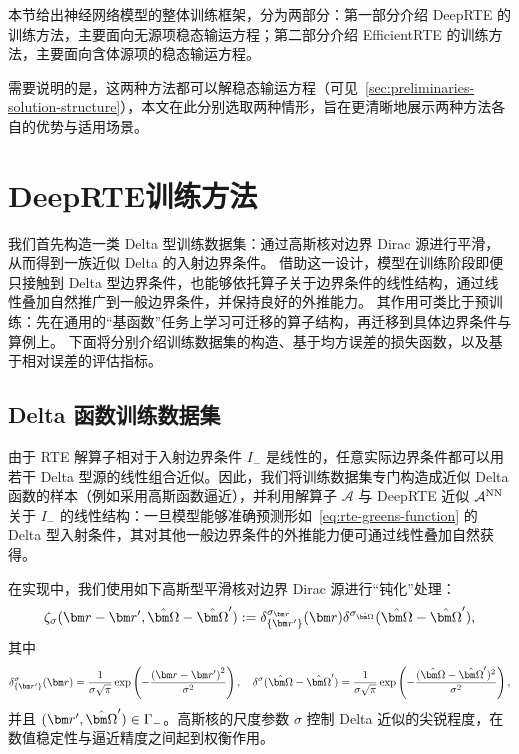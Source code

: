 
本节给出神经网络模型的整体训练框架，分为两部分：第一部分介绍 DeepRTE 的训练方法，主要面向无源项稳态输运方程；第二部分介绍 EfficientRTE 的训练方法，主要面向含体源项的稳态输运方程。

需要说明的是，这两种方法都可以解稳态输运方程（可见~\ref{sec:preliminaries-solution-structure}），本文在此分别选取两种情形，旨在更清晰地展示两种方法各自的优势与适用场景。

\section{DeepRTE训练方法}


我们首先构造一类 Delta 型训练数据集：通过高斯核对边界 Dirac 源进行平滑，从而得到一族近似 Delta 的入射边界条件。
借助这一设计，模型在训练阶段即便只接触到 Delta 型边界条件，也能够依托算子关于边界条件的线性结构，通过线性叠加自然推广到一般边界条件，并保持良好的外推能力。
其作用可类比于预训练：先在通用的“基函数”任务上学习可迁移的算子结构，再迁移到具体边界条件与算例上。
下面将分别介绍训练数据集的构造、基于均方误差的损失函数，以及基于相对误差的评估指标。

\subsection{Delta 函数训练数据集}

由于 RTE 解算子相对于入射边界条件 $I_-$ 是线性的，任意实际边界条件都可以用若干 Delta 型源的线性组合近似。因此，我们将训练数据集专门构造成近似 Delta 函数的样本（例如采用高斯函数逼近），并利用解算子 $\mathcal{A}$ 与 DeepRTE 近似 $\mathcal{A}^{\text{NN}}$ 关于 $I_-$ 的线性结构：一旦模型能够准确预测形如~\eqref{eq:rte-greens-function} 的 Delta 型入射条件，其对其他一般边界条件的外推能力便可通过线性叠加自然获得。

在实现中，我们使用如下高斯型平滑核对边界 Dirac 源进行“钝化”处理：
\begin{equation}
    \zeta_\sigma(\br-\br', \bOmega-\bOmega') := \delta^{\sigma_{\br}}_{\{\br'\}}(\br)\delta^{\sigma_{\bOmega}}(\bOmega-\bOmega'),
\end{equation}
其中
\begin{equation}\label{eq:delta_defination}
    \delta_{\{\br'\}}^{\sigma}(\br) = \frac{1}{\sigma \sqrt{\pi}} \exp\left( -\frac{{(\br-\br')}^2}{\sigma^2} \right), \quad
    \delta^{\sigma}(\bOmega-\bOmega') = \frac{1}{\sigma \sqrt{\pi}} \exp\left( -\frac{(\bOmega-\bOmega')^2}{\sigma^2} \right),
\end{equation}
并且 $(\br', \bOmega') \in \Gamma_-$。高斯核的尺度参数 $\sigma$ 控制 Delta 近似的尖锐程度，在数值稳定性与逼近精度之间起到权衡作用。

